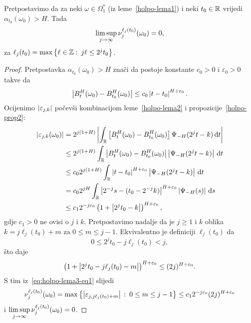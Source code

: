 \documentclass[main.tex]{subfiles}
\begin{document}
\begin{lema}\label{holpo-lema3}
	Pretpostavimo da za neki \( \omega \in \Omega_1^* \) (iz leme~\ref{holpo-lema1}) i neki
	\( t_0 \in \mathbb{R} \) vrijedi \( \alpha_{t_0}(\omega_0) > H \). Tada
	\begin{equation}
		\limsup\limits_{j \rightarrow \infty} \nu_j^{\ell_j(t_0)}(\omega_0) = 0,
	\end{equation}
	za \( \ell_j(t_0) = \max\left\{ \ell \in \mathbb{Z} \, \colon \, j\ell \le 2^jt_0 \right\} \).
\end{lema}

\begin{proof}
	Pretpostavka \( \alpha_{t_0}(\omega_0) > H \) znači da postoje konstante \( c_0 > 0 \) i \( \varepsilon_0 > 0 \)
	takve da
	\begin{equation}
		\left| {B^H_t(\omega_0)- B^H_{t_0}(\omega_0)} \right| \le
		c_0 \left| {t-t_0} \right|^{H+\varepsilon_0}.
	\end{equation}
	Ocijenimo \( \left| {\varepsilon_{j,k}} \right| \) počevši kombinacijom leme~\ref{holpo-lema2} i propozicije~\ref{holpo-prop2}:
	\begin{align}
		\left| {\varepsilon_{j,k}(\omega_0)} \right| & =
		2^{j(1+H)}\left| {\int_{\mathbb{R}} \left[ B^H_t(\omega_0)-B^H_{t_0}(\omega_0) \right] \Psi_{-H}(2^jt-k) \,\mathrm d t} \right|                                          \\
		                                  & \le 2^{j(1+H)} \int_{\mathbb{R}} \left| {B^H_t(\omega_0)-B^H_{t_0}(\omega_0)} \right| \left| {\Psi_{-H}(2^jt-k)} \right| \,\mathrm d t          \\
		                                  & \le c_02^{j(1+H)} \int_{\mathbb{R}} \left| {t-t_0} \right|^{H+\varepsilon_0}\left| {\Psi_{-H}(2^jt-k)} \right| \,\mathrm d t                    \\
		                                  & = c_02^{jH}\int_{\mathbb{R}} \left| {2^{-j}s-(t_0-2^{-j}k)} \right|^{H+\varepsilon_0}\left| {\Psi_{-H}(s)} \right| \,\mathrm d s                \\
		                                  & \le c_1 2^{-j\varepsilon_0}\left( 1+\left| {2^jt_0-k} \right|\right)^{H+\varepsilon_0} \label{eq:holpo-lema3-eq1},
	\end{align}
	gdje \( c_1 > 0 \) ne ovisi o \( j \) i \( k \). Pretpostavimo nadalje da je \( j \ge 1 \)
	i \( k \) oblika \( k=j\ell_j(t_0)+m \) za \( 0 \le m \le j-1 \). Ekvivalentno je definiciji
	\( \ell_j(t_0) \) da
	\begin{equation}
		0 \le 2^jt_0 - j\ell_j(t_0) < j,
	\end{equation}
	što daje
	\begin{equation}
		\left( 1+\left| {2^jt_0-j\ell_j(t_0)-m} \right| \right)^{H+\varepsilon_0}
		\le (2j)^{H+\varepsilon_0}.
	\end{equation}
	S tim iz~\eqref{eq:holpo-lema3-eq1} slijedi
	\begin{equation}
		\nu_j^{\ell_j(t_0)}(\omega_0) =
		\max \left\{ \left| {\varepsilon_{j,j\ell_j(t_0)+m}} \right| \, \colon \, 0 \le m \le j-1  \right\} \le
		c_1 2^{-j\varepsilon_0}(2j)^{H+\varepsilon_0}
	\end{equation}
	i \( \limsup\limits_{j\rightarrow \infty} \nu_j^{\ell_j(t_0)}(\omega_0)=0 \).
\end{proof}
\end{document}
